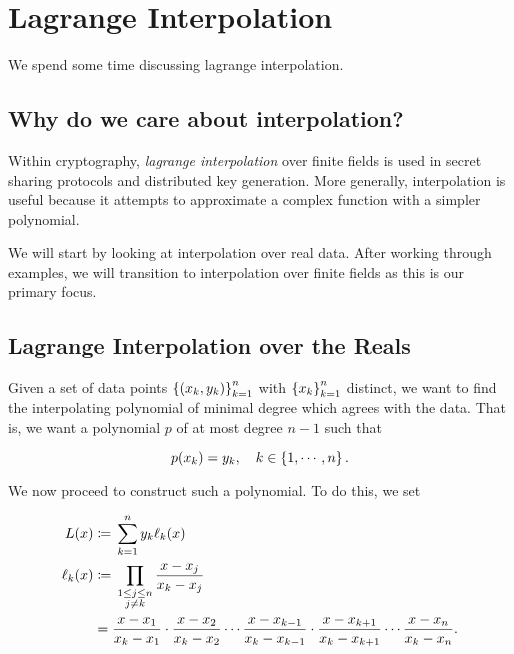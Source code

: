 \section{Lagrange Interpolation}
\label{sec:math_lagrange}

We spend some time discussing \gls{lagrange interpolation}.

\subsection{Why do we care about interpolation?}

Within cryptography, \emph{\gls{lagrange interpolation}}
over \glspl{finite field}
is used in secret sharing protocols and \gls{distributed key generation}.
More generally, interpolation is useful because
it attempts to approximate a complex function with a simpler polynomial.

We will start by looking at interpolation over real data.
After working through examples, we will transition
to interpolation over \glspl{finite field} as this is our primary focus.

\subsection{Lagrange Interpolation over the Reals}

Given a set of data points $\left\{ \left( x_{k},y_{k} \right) \right\}_{k=1}^{n}$
with $\left\{ x_{k} \right\}_{k=1}^{n}$ distinct,
we want to find the interpolating polynomial of minimal degree
which agrees with the data.
That is, we want a polynomial $p$ of at most degree $n-1$ such that

\begin{equation}
    p(x_{k}) = y_{k}, \quad k\in\left\{ 1,\cdots,n \right\}.
\end{equation}

We now proceed to construct such a polynomial.
To do this, we set

\begin{align}
    L(x) &\coloneqq{} \sum_{k=1}^{n} y_{k}\ell_{k}(x) \nonumber\\
    \ell_{k}(x) &\coloneqq{}
        \prod_{\substack{1\le j \le n \\ j\ne k}} \frac{x-x_{j}}{x_{k}-x_{j}}
            \nonumber\\
        &=
        \frac{x-x_{1}}{x_{k}-x_{1}}\cdot
        \frac{x-x_{2}}{x_{k}-x_{2}}\cdots
        \frac{x-x_{k-1}}{x_{k}-x_{k-1}}\cdot
        \frac{x-x_{k+1}}{x_{k}-x_{k+1}}\cdots
        \frac{x-x_{n}}{x_{k}-x_{n}}.
    \label{eq:math_lagrange_def}
\end{align}


